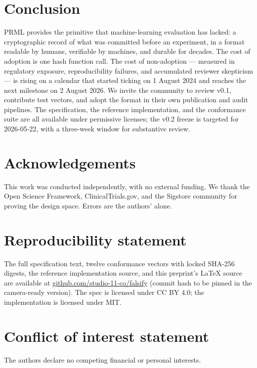 \documentclass[11pt, a4paper]{article}
\begin{document}
\section{Conclusion}
\label{sec:conclusion}

PRML provides the primitive that machine-learning evaluation has lacked: a cryptographic record of what was committed before an experiment, in a format readable by humans, verifiable by machines, and durable for decades. The cost of adoption is one hash function call. The cost of non-adoption --- measured in regulatory exposure, reproducibility failures, and accumulated reviewer skepticism --- is rising on a calendar that started ticking on 1 August 2024 and reaches the next milestone on 2 August 2026. We invite the community to review v0.1, contribute test vectors, and adopt the format in their own publication and audit pipelines. The specification, the reference implementation, and the conformance suite are all available under permissive licenses; the v0.2 freeze is targeted for 2026-05-22, with a three-week window for substantive review.

\section*{Acknowledgements}

This work was conducted independently, with no external funding. We thank the Open Science Framework, ClinicalTrials.gov, and the Sigstore community for proving the design space. Errors are the authors' alone.

\section*{Reproducibility statement}

The full specification text, twelve conformance vectors with locked SHA-256 digests, the reference implementation source, and this preprint's \LaTeX{} source are available at \href{https://github.com/studio-11-co/falsify}{github.com/studio-11-co/falsify} (commit hash to be pinned in the camera-ready version). The spec is licensed under CC BY 4.0; the implementation is licensed under MIT.

\section*{Conflict of interest statement}

The authors declare no competing financial or personal interests.
\end{document}
